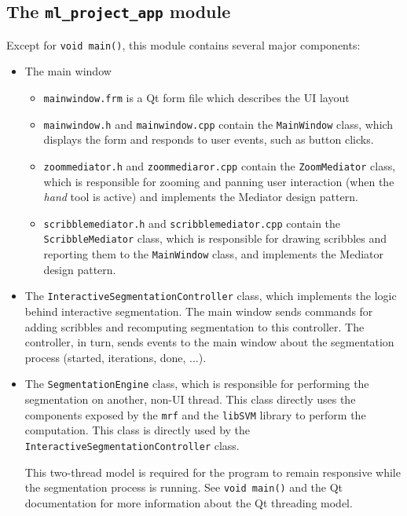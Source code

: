 \documentclass[12pt,a4paper]{article}
\begin{document}
\subsection{The \texttt{ml\_project\_app} module}
Except for \texttt{void main()}, this module contains several major components:
\begin{itemize}
	\item The main window
	\begin{itemize}
		\item \texttt{mainwindow.frm} is a Qt form file which describes the UI layout
		\item \texttt{mainwindow.h} and \texttt{mainwindow.cpp} contain the \texttt{MainWindow} class, which displays the form and responds to user events, such as button clicks.
		\item \texttt{zoommediator.h} and \texttt{zoommediaror.cpp} contain the \texttt{ZoomMediator} class, which is responsible for zooming and panning user interaction (when the \textit{hand} tool is active) and implements the Mediator design pattern.
		\item \texttt{scribblemediator.h} and \texttt{scribblemediator.cpp} contain the \texttt{\allowbreak ScribbleMediator} class, which is responsible for drawing scribbles and reporting them to the \texttt{MainWindow} class, and implements the Mediator design pattern.
	\end{itemize}
	\item The \texttt{InteractiveSegmentationController} class, which implements the logic behind interactive segmentation. The main window sends commands for adding scribbles and recomputing segmentation to this controller. The controller, in turn, sends events to the main window about the segmentation process (started, iterations, done, ...). 
	\item The \texttt{SegmentationEngine} class, which is responsible for performing the segmentation on another, non-UI thread. This class directly uses the components exposed by the \texttt{mrf} and the \texttt{libSVM} library to perform the computation. This class is directly used by the \texttt{\allowbreak Interactive\allowbreak Segmentation\allowbreak Controller} class.
	
	This two-thread model is required for the program to remain responsive while the segmentation process is running. See \texttt{void main()} and the Qt documentation for more information about the Qt threading model.
\end{itemize}
\end{document}
